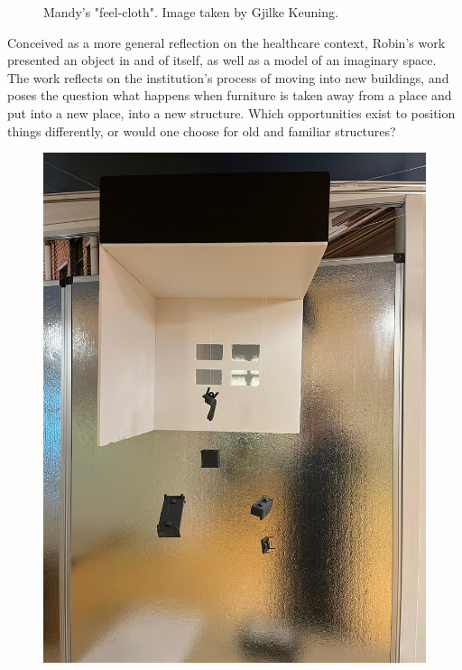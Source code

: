\documentclass[authordate, empirical]{jote-new-article}
\begin{document}
{\begin{figure}
		\caption{Mandy's "feel-cloth". Image taken by Gjilke Keuning.}



	\end{figure}













	Conceived as a more general reflection on the healthcare context, Robin's work presented an object in and of itself, as well as a model of an imaginary space. The work reflects on the institution's process of moving into new buildings, and poses the question what happens when furniture is taken away from a place and put into a new place, into a new structure. Which opportunities exist to position things differently, or would one choose for old and familiar structures?







	\begin{figure}
		\includegraphics[width=\linewidth]{media/fig4.jpeg}


\end{figure}}
\end{document}
